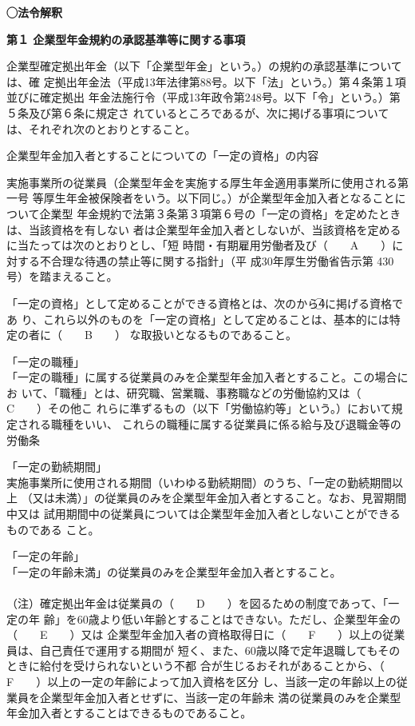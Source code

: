 \begin{fillblank}[数理人試験 2022 問題1 設問6]
  \noindent \textbf{◯法令解釈}
  \begin{lawstructure}
    \begin{lawarticle}{}{}
       \textbf{第１ 企業型年金規約の承認基準等に関する事項}

      企業型確定拠出年金（以下「企業型年金」という。）の規約の承認基準については、確
定拠出年金法（平成13年法律第88号。以下「法」という。）第４条第１項並びに確定拠出
年金法施行令（平成13年政令第248号。以下「令」という。）第５条及び第６条に規定さ
れているところであるが、次に掲げる事項については、それぞれ次のとおりとすること。

      企業型年金加入者とすることについての「一定の資格」の内容
      
      実施事業所の従業員（企業型年金を実施する厚生年金適用事業所に使用される第一号
等厚生年金被保険者をいう。以下同じ。）が企業型年金加入者となることについて企業型
年金規約で法第３条第３項第６号の「一定の資格」を定めたときは、当該資格を有しない
者は企業型年金加入者としないが、当該資格を定めるに当たっては次のとおりとし、「短
時間・有期雇用労働者及び（　　A　　）に対する不合理な待遇の禁止等に関する指針」（平
成30年厚生労働省告示第 430号）を踏まえること。

      「一定の資格」として定めることができる資格とは、次のから\textcircled{4}に掲げる資格であ
り、これら以外のものを「一定の資格」として定めることは、基本的には特定の者に（　　B　　）
な取扱いとなるものであること。

      「一定の職種」\\
      「一定の職種」に属する従業員のみを企業型年金加入者とすること。この場合にお
いて、「職種」とは、研究職、営業職、事務職などの労働協約又は（　　C　　）その他こ
れらに準ずるもの（以下「労働協約等」という。）において規定される職種をいい、
これらの職種に属する従業員に係る給与及び退職金等の労働条

「一定の勤続期間」\\
実施事業所に使用される期間（いわゆる勤続期間）のうち、「一定の勤続期間以上
（又は未満）」の従業員のみを企業型年金加入者とすること。なお、見習期間中又は
試用期間中の従業員については企業型年金加入者としないことができるものである
こと。

      「一定の年齢」\\
「一定の年齢未満」の従業員のみを企業型年金加入者とすること。
\\ \\
（注）確定拠出年金は従業員の（　　D　　）を図るための制度であって、「一定の年
齢」を60歳より低い年齢とすることはできない。ただし、企業型年金の（　　E　　）又は
企業型年金加入者の資格取得日に（　　F　　）以上の従業員は、自己責任で運用する期間が
短く、また、60歳以降で定年退職してもそのときに給付を受けられないという不都
合が生じるおそれがあることから、（　　F　　）以上の一定の年齢によって加入資格を区分
し、当該一定の年齢以上の従業員を企業型年金加入者とせずに、当該一定の年齢未
満の従業員のみを企業型年金加入者とすることはできるものであること。


\end{lawarticle}
\end{lawstructure}
\end{fillblank}
